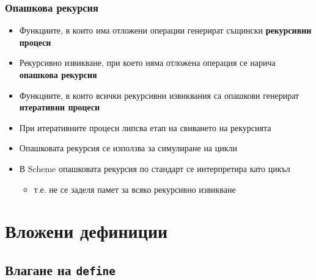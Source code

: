 \documentclass[alsotrans,beameroptions={aspectratio=169}]{beamerswitch}
\begin{document}
\begin{frame}
  \frametitle{Опашкова рекурсия}

  \begin{itemize}[<+->]
  \item Функциите, в които има отложени операции генерират същински \textbf{рекурсивни процеси}
  \item Рекурсивно извикване, при което няма отложена операция се нарича \textbf{опашкова рекурсия}
  \item Функциите, в които всички рекурсивни извиквания са опашкови генерират \textbf{итеративни процеси}
  \item При итеративните процеси липсва етап на свиването на рекурсията
  \item Опашковата рекурсия се използва за симулиране на цикли
  \item В Scheme опашковата рекурсия \alert{по стандарт} се интерпретира като цикъл
    \begin{itemize}
    \item т.е. не се заделя памет за всяко рекурсивно извикване
    \end{itemize}
  \end{itemize}
\end{frame}

\section{Вложени дефиниции}



\subsection{Влагане на \tt{define}}
\end{document}
